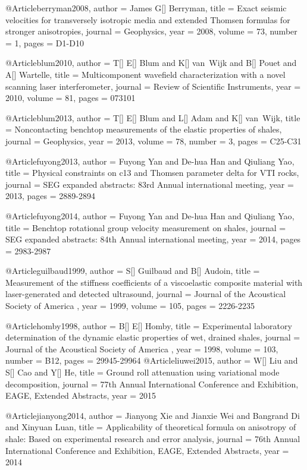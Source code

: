 @Article{berryman2008,
  author = 	 {James G[] Berryman},
  title = 	 {Exact seismic velocities for transversely isotropic media and extended Thomsen formulas for stronger anisotropies},
  journal = 	 {Geophysics},
  year = 	 2008,
  volume = 	 73,
  number = 	 1,
  pages = 	 {D1-D10}}

@Article{blum2010,
  author = 	 {T[] E[] Blum and K[] van~Wijk and B[] Pouet and A[] Wartelle},
  title = 	 {Multicomponent wavefield characterization with a novel scanning laser interferometer},
  journal = 	 {Review of Scientific Instruments},
  year = 	 2010,
  volume = 	 81,
  pages = 	 {073101}}

@Article{blum2013,
  author = 	 {T[] E[] Blum and L[] Adam and K[] van~Wijk},
  title = 	 {Noncontacting benchtop measurements of the elastic properties of shales},
  journal = 	 {Geophysics},
  year = 	 2013,
  volume = 	 78,
  number = 	 3,
  pages = 	 {C25-C31}}

@Article{fuyong2013,
  author = 	 {Fuyong Yan and De-hua Han and Qiuliang Yao},
  title = 	 {Physical constraints on c13 and Thomsen parameter delta for VTI rocks},
  journal = 	 {SEG expanded abstracts: 83rd Annual international meeting},
  year = 	 2013,
  pages = 	 {2889-2894}}

@Article{fuyong2014,
  author = 	 {Fuyong Yan and De-hua Han and Qiuliang Yao},
  title = 	 {Benchtop rotational group velocity measurement on shales},
  journal = 	 {SEG expanded abstracts: 84th Annual international meeting},
  year = 	 2014,
  pages = 	 {2983-2987}}

@Article{guilbaud1999,
  author = 	 {S[] Guilbaud and B[] Audoin},
  title = 	 {Measurement of the stiffness coefficients of a viscoelastic composite material with laser-generated and detected ultrasound},
  journal = 	 { Journal of the Acoustical Society of America },
  year = 	 1999,
  volume = 	 105,
  pages = 	 {2226-2235}}

@Article{homby1998,
  author = 	 {B[] E[] Homby},
  title = 	 {Experimental laboratory determination of the dynamic elastic properties of wet, drained shales},
  journal = 	 { Journal of the Acoustical Society of America },
  year = 	 1998,
  volume = 	 103,
  number = B12,
  pages = 	 {29945-29964}}
@Article{liuwei2015,
  author = 	 {W[] Liu and S[] Cao and Y[] He},
  title = 	 {Ground roll attenuation using variational mode decomposition},
  journal = 	 { 77th Annual International Conference and Exhibition, EAGE, Extended Abstracts},
  year = 	 2015}

  
@Article{jianyong2014,
  author = 	 {Jianyong Xie and Jianxie Wei and Bangrand Di and Xinyuan Luan},
  title = 	 {Applicability of theoretical formula on anisotropy of shale: Based on experimental research and error analysis},
  journal = 	 { 76th Annual International Conference and Exhibition, EAGE, Extended Abstracts},
  year = 	 2014}


